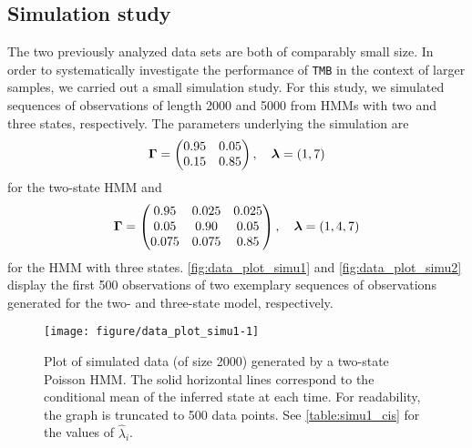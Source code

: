 \documentclass[bimj,fleqn]{w-art}\usepackage[]{graphicx}\usepackage[]{color}
\makeatletter
\def\maxwidth{ %
  \ifdim\Gin@nat@width>\linewidth
    \linewidth
  \else
    \Gin@nat@width
  \fi
}
\newenvironment{knitrout}{}{} %
\newcommand{\bgamma}{\mbox{\boldmath $\Gamma$}}
\newcommand{\bflambda}{\mbox{\boldmath $\lambda$}}
\theoremstyle{plain}
\theoremstyle{definition}
\makeatother
\begin{document}
\subsection{Simulation study}
\label{sec:simu_study}


The two previously analyzed data sets are both of comparably small size. In order to systematically investigate the performance of {\tt TMB} in the context of larger samples, we carried out a small simulation study. For this study, we simulated sequences of observations of length 2000 and 5000 from HMMs with two and three states, respectively. The parameters underlying the simulation are
\begin{equation*}
\bgamma =
\begin{pmatrix}
0.95 & 0.05\\
0.15 & 0.85
\end{pmatrix}, \quad
\bflambda = (1, 7)
\end{equation*}
for the two-state HMM and
\begin{equation*}
\bgamma =
\begin{pmatrix}
0.95 & 0.025 & 0.025\\
0.05 & 0.90 & 0.05\\
0.075 & 0.075 & 0.85
\end{pmatrix}, \quad
\bflambda = (1, 4, 7)
\end{equation*}
for the HMM with three states. \autoref{fig:data_plot_simu1} and \autoref{fig:data_plot_simu2} display the first 500 observations of two exemplary sequences of observations generated for the two- and three-state model, respectively.


\begin{knitrout}
\color{fgcolor}\begin{figure}[htb]

{\centering \texttt{[image: figure/data\_plot\_simu1-1]} 

}

\caption{Plot of simulated data (of size 2000) generated by a two-state Poisson HMM. The solid horizontal lines correspond to the conditional mean of the inferred state at each time. For readability, the graph is truncated to 500 data points. See \autoref{table:simu1_cis} for the values of $\widehat{\lambda}_i$.}\label{fig:data_plot_simu1}
\end{figure}

\end{knitrout}
\end{document}
